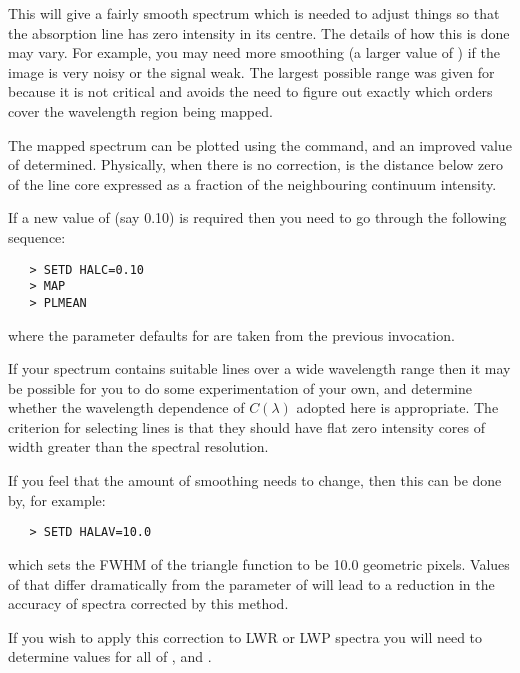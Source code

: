 This will give a fairly smooth spectrum which is needed to adjust things
so that the absorption line has zero intensity in its centre.  The details of
how this is done may vary.  For example, you may need more smoothing (a
larger value of ) if the image is very noisy
or the signal weak.
The largest possible range was given for 
because it is not critical and avoids the need to figure out exactly which
orders cover the wavelength region being mapped.

The mapped spectrum can be plotted using the 
 command, and an
improved value of 
 determined. Physically, when there is no
correction, 
 is the distance below zero of the line core expressed
as a fraction of the neighbouring continuum intensity.

If a new value of 
 (say 0.10) is required then you need to go
through the following sequence:

\begin{verbatim}
   > SETD HALC=0.10
   > MAP
   > PLMEAN
\end{verbatim}

where the parameter defaults for  are taken
from the previous invocation.

If your spectrum contains suitable lines over a wide wavelength range then it
may be possible for you to do some experimentation of your own, and determine
whether the wavelength dependence of $C(\lambda)$ adopted here is appropriate.
The criterion for selecting lines is that they should have flat zero intensity
cores of width greater than the spectral resolution.

If you feel that the amount of smoothing needs to change, then this can be done
by, for example:

\begin{verbatim}
   > SETD HALAV=10.0
\end{verbatim}

which sets the FWHM of the triangle function to be 10.0 geometric pixels.
Values of 
 that differ dramatically from the 
 parameter
of 
 will lead to a reduction in the accuracy of spectra corrected by
this method.

If you wish to apply this correction to LWR or LWP spectra you will need to
determine values for all of ,
 and \@.

